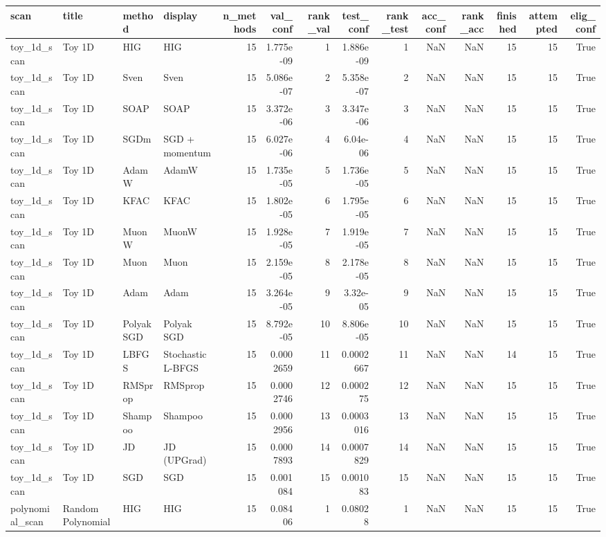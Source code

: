 \begin{tabular}{llllrrrrrrrrrr}
\toprule
scan & title & method & display & n\_methods & val\_conf & rank\_val & test\_conf & rank\_test & acc\_conf & rank\_acc & finished & attempted & elig\_conf \\
\midrule
toy\_1d\_scan & Toy 1D & HIG & HIG & 15 & 1.775e-09 & 1 & 1.886e-09 & 1 & NaN & NaN & 15 & 15 & True \\
toy\_1d\_scan & Toy 1D & Sven & Sven & 15 & 5.086e-07 & 2 & 5.358e-07 & 2 & NaN & NaN & 15 & 15 & True \\
toy\_1d\_scan & Toy 1D & SOAP & SOAP & 15 & 3.372e-06 & 3 & 3.347e-06 & 3 & NaN & NaN & 15 & 15 & True \\
toy\_1d\_scan & Toy 1D & SGDm & SGD + momentum & 15 & 6.027e-06 & 4 & 6.04e-06 & 4 & NaN & NaN & 15 & 15 & True \\
toy\_1d\_scan & Toy 1D & AdamW & AdamW & 15 & 1.735e-05 & 5 & 1.736e-05 & 5 & NaN & NaN & 15 & 15 & True \\
toy\_1d\_scan & Toy 1D & KFAC & KFAC & 15 & 1.802e-05 & 6 & 1.795e-05 & 6 & NaN & NaN & 15 & 15 & True \\
toy\_1d\_scan & Toy 1D & MuonW & MuonW & 15 & 1.928e-05 & 7 & 1.919e-05 & 7 & NaN & NaN & 15 & 15 & True \\
toy\_1d\_scan & Toy 1D & Muon & Muon & 15 & 2.159e-05 & 8 & 2.178e-05 & 8 & NaN & NaN & 15 & 15 & True \\
toy\_1d\_scan & Toy 1D & Adam & Adam & 15 & 3.264e-05 & 9 & 3.32e-05 & 9 & NaN & NaN & 15 & 15 & True \\
toy\_1d\_scan & Toy 1D & PolyakSGD & Polyak SGD & 15 & 8.792e-05 & 10 & 8.806e-05 & 10 & NaN & NaN & 15 & 15 & True \\
toy\_1d\_scan & Toy 1D & LBFGS & Stochastic L-BFGS & 15 & 0.0002659 & 11 & 0.0002667 & 11 & NaN & NaN & 14 & 15 & True \\
toy\_1d\_scan & Toy 1D & RMSprop & RMSprop & 15 & 0.0002746 & 12 & 0.000275 & 12 & NaN & NaN & 15 & 15 & True \\
toy\_1d\_scan & Toy 1D & Shampoo & Shampoo & 15 & 0.0002956 & 13 & 0.0003016 & 13 & NaN & NaN & 15 & 15 & True \\
toy\_1d\_scan & Toy 1D & JD & JD (UPGrad) & 15 & 0.0007893 & 14 & 0.0007829 & 14 & NaN & NaN & 15 & 15 & True \\
toy\_1d\_scan & Toy 1D & SGD & SGD & 15 & 0.001084 & 15 & 0.001083 & 15 & NaN & NaN & 15 & 15 & True \\
polynomial\_scan & Random Polynomial & HIG & HIG & 15 & 0.08406 & 1 & 0.08028 & 1 & NaN & NaN & 15 & 15 & True \\

\end{tabular}
